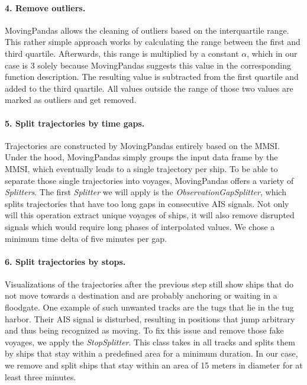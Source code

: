 \paragraph{4. Remove outliers.}
MovingPandas allows the cleaning of outliers based on the interquartile range. This rather simple approach works by calculating the range between the first and third quartile. Afterwards, this range is multiplied by a constant $\alpha$, which in our case is 3 solely because MovingPandas suggests this value in the corresponding function description. The resulting value is subtracted from the first quartile and added to the third quartile. All values outside the range of those two values are marked as outliers and get removed.

\paragraph{5. Split trajectories by time gaps.}
Trajectories are constructed by MovingPandas entirely based on the MMSI. Under the hood, MovingPandas simply groups the input data frame by the MMSI, which eventually leads to a single trajectory per ship. To be able to separate those single trajectories into voyages, MovingPandas offers a variety of \textit{Splitters}. The first \textit{Splitter} we will apply is the \textit{ObservationGapSplitter}, which splits trajectories that have too long gaps in consecutive AIS signals. Not only will this operation extract unique voyages of ships, it will also remove disrupted signals which would require long phases of interpolated values.
We chose a minimum time delta of five minutes per gap.

\paragraph{6. Split trajectories by stops.}
Visualizations of the trajectories after the previous step still show ships that do not move towards a destination and are probably anchoring or waiting in a floodgate. One example of such unwanted tracks are the tugs that lie in the tug harbor. Their AIS signal is disturbed, resulting in positions that jump arbitrary and thus being recognized as moving. To fix this issue and remove those fake voyages, we apply the \textit{StopSplitter}. This class takes in all tracks and splits them by ships that stay within a predefined area for a minimum duration. In our case, we remove and split ships that stay within an area of 15 meters in diameter for at least three minutes.


